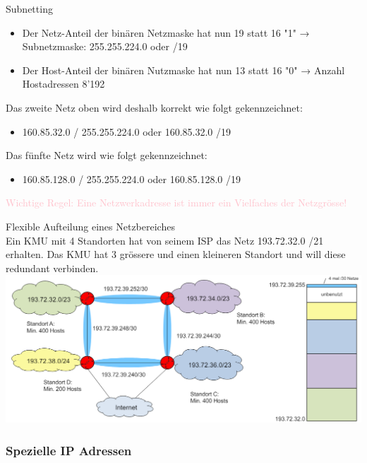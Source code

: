 \begin{concept}{Subnetting}
    \begin{itemize}
        \item Der Netz-Anteil der binären Netzmaske hat nun 19 statt 16 "1" → Subnetzmaske: 255.255.224.0 oder /19
        \item Der Host-Anteil der binären Nutzmaske hat nun 13 statt 16 "0" → Anzahl Hostadressen 8'192
    \end{itemize}
    Das zweite Netz oben wird deshalb korrekt wie folgt gekennzeichnet:
    \begin{itemize}
        \item 160.85.32.0 / 255.255.224.0 oder 160.85.32.0 /19
    \end{itemize}
    Das fünfte Netz wird wie folgt gekennzeichnet:
    \begin{itemize}
        \item 160.85.128.0 / 255.255.224.0 oder 160.85.128.0 /19
    \end{itemize}
    \textcolor{pink}{Wichtige Regel: Eine Netzwerkadresse ist immer ein Vielfaches der Netzgrösse!}
\end{concept}

\begin{example2}{Flexible Aufteilung eines Netzbereiches}\\
    Ein KMU mit 4 Standorten hat von seinem ISP das Netz 193.72.32.0 /21 erhalten. Das KMU hat 3 grössere und einen kleineren Standort und will diese redundant verbinden.\\
        \includegraphics[width=1\linewidth]{images/flexible_aufteilung_netzbereich.png}    
\end{example2}

\subsubsection{Spezielle IP Adressen}

